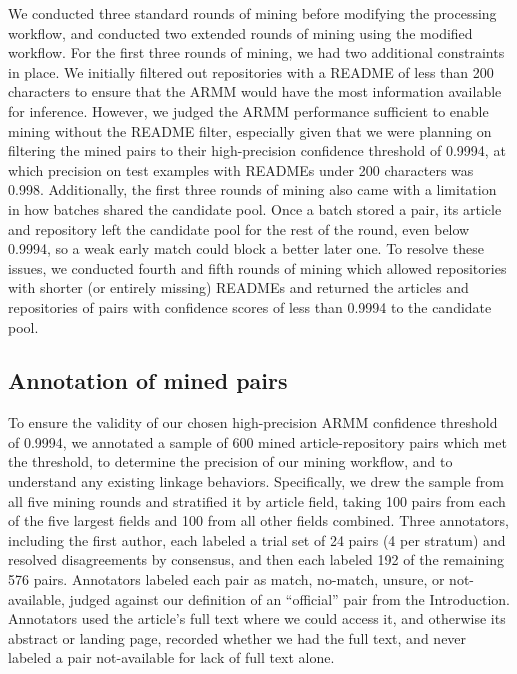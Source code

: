 \documentclass[pdflatex,sn-nature]{sn-jnl}%
\begin{document}
We conducted three standard rounds of mining before modifying the processing workflow, and conducted two extended rounds of mining using the modified workflow.
For the first three rounds of mining, we had two additional constraints in place.
We initially filtered out repositories with a README of less than 200 characters to ensure that the ARMM would have the most information available for inference.
However, we judged the ARMM performance sufficient to enable mining without the README filter, especially given that we were planning on filtering the mined pairs to their high-precision confidence threshold of 0.9994, at which precision on test examples with READMEs under 200 characters was 0.998.
Additionally, the first three rounds of mining also came with a limitation in how batches shared the candidate pool.
Once a batch stored a pair, its article and repository left the candidate pool for the rest of the round, even below 0.9994, so a weak early match could block a better later one.
To resolve these issues, we conducted fourth and fifth rounds of mining which allowed repositories with shorter (or entirely missing) READMEs and returned the articles and repositories of pairs with confidence scores of less than 0.9994 to the candidate pool.

\subsection{Annotation of mined pairs}\label{subsec:m-annotation}

To ensure the validity of our chosen high-precision ARMM confidence threshold of 0.9994, we annotated a sample of 600 mined article-repository pairs which met the threshold, to determine the precision of our mining workflow, and to understand any existing linkage behaviors.
Specifically, we drew the sample from all five mining rounds and stratified it by article field, taking 100 pairs from each of the five largest fields and 100 from all other fields combined.
Three annotators, including the first author, each labeled a trial set of 24 pairs (4 per stratum) and resolved disagreements by consensus, and then each labeled 192 of the remaining 576 pairs.
Annotators labeled each pair as match, no-match, unsure, or not-available, judged against our definition of an ``official'' pair from the Introduction.
Annotators used the article's full text where we could access it, and otherwise its abstract or landing page, recorded whether we had the full text, and never labeled a pair not-available for lack of full text alone.
\end{document}
